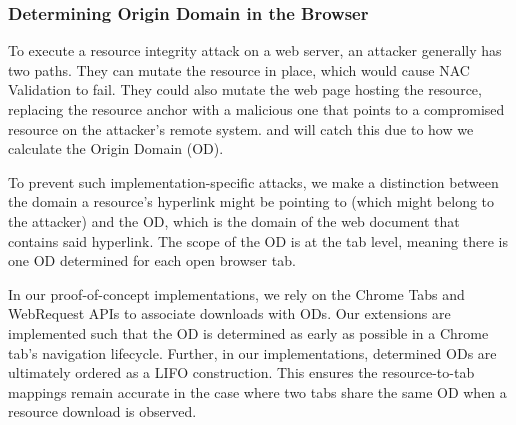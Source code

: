 \subsubsection{Determining Origin Domain in the Browser}

To execute a resource integrity attack on a web server, an attacker generally
has two paths. They can mutate the resource in place, which would cause NAC
Validation to fail. They could also mutate the web page hosting the resource,
replacing the resource anchor with a malicious one that points to a compromised
resource on the attacker's remote system. \DNSSYS{} and \DHTSYS{} will catch
this due to how we calculate the Origin Domain (OD).

To prevent such implementation-specific attacks, we make a distinction between
the domain a resource's hyperlink might be pointing to (which might belong to
the attacker) and the OD, which is the domain of the web document that contains
said hyperlink. The scope of the OD is at the tab level, meaning there is one OD
determined for each open browser tab.

In our proof-of-concept implementations, we rely on the Chrome Tabs and
WebRequest APIs to associate downloads with ODs. Our extensions are implemented
such that the OD is determined as early as possible in a Chrome tab's navigation
lifecycle. Further, in our implementations, determined ODs are ultimately
ordered as a LIFO construction. This ensures the resource-to-tab mappings remain
accurate in the case where two tabs share the same OD when a resource download
is observed.
